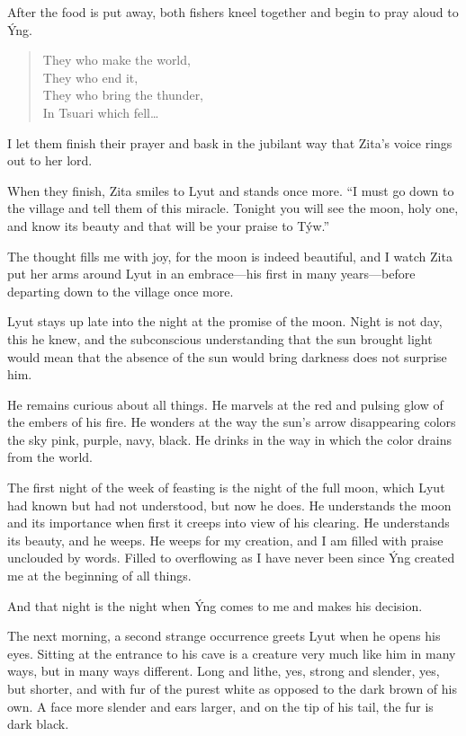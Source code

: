 After the food is put away, both fishers kneel together and begin to pray aloud to Ýng.

\begin{quote}
They who make the world, \\
They who end it, \\
They who bring the thunder, \\
In Tsuari which fell\ldots
\end{quote}

I let them finish their prayer and bask in the jubilant way that Zita's voice rings out to her lord.

When they finish, Zita smiles to Lyut and stands once more. ``I must go down to the village and tell them of this miracle. Tonight you will see the moon, holy one, and know its beauty and that will be your praise to Týw.''

The thought fills me with joy, for the moon is indeed beautiful, and I watch Zita put her arms around Lyut in an embrace---his first in many years---before departing down to the village once more.

\secdiv

\noindent Lyut stays up late into the night at the promise of the moon. Night is not day, this he knew, and the subconscious understanding that the sun brought light would mean that the absence of the sun would bring darkness does not surprise him.

He remains curious about all things. He marvels at the red and pulsing glow of the embers of his fire. He wonders at the way the sun's arrow disappearing colors the sky pink, purple, navy, black. He drinks in the way in which the color drains from the world.

The first night of the week of feasting is the night of the full moon, which Lyut had known but had not understood, but now he does. He understands the moon and its importance when first it creeps into view of his clearing. He understands its beauty, and he weeps. He weeps for my creation, and I am filled with praise unclouded by words. Filled to overflowing as I have never been since Ýng created me at the beginning of all things.

And that night is the night when Ýng comes to me and makes his decision.

The next morning, a second strange occurrence greets Lyut when he opens his eyes. Sitting at the entrance to his cave is a creature very much like him in many ways, but in many ways different. Long and lithe, yes, strong and slender, yes, but shorter, and with fur of the purest white as opposed to the dark brown of his own. A face more slender and ears larger, and on the tip of his tail, the fur is dark black.

